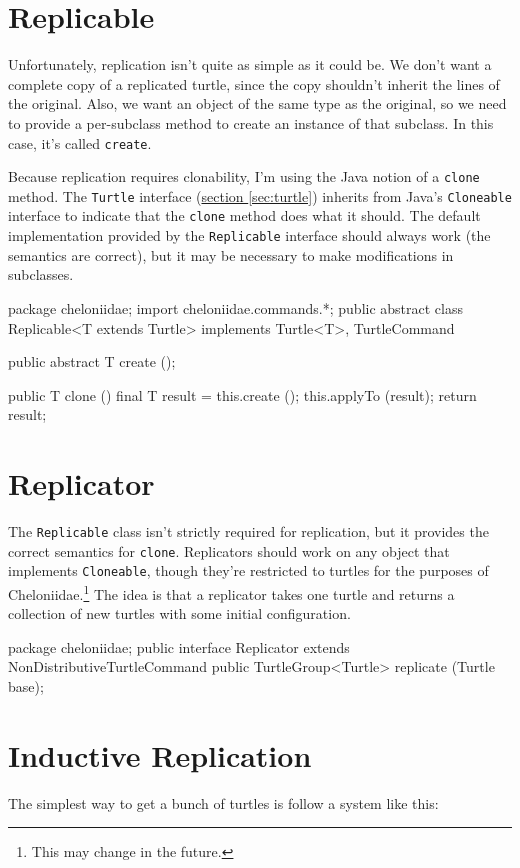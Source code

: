\documentclass{report}
\newcommand{\Ref}[2]{\hyperref[#2]{#1 \ref*{#2}}}
\begin{document}
\section {Replicable} \label{sec:replicable}
      Unfortunately, replication isn't quite as simple as it could be. We don't want a complete copy of a replicated turtle, since the copy shouldn't inherit
      the lines of the original. Also, we want an object of the same type as the original, so we need to provide a per-subclass method to create an instance of
      that subclass. In this case, it's called {\tt create}.

      Because replication requires clonability, I'm using the Java notion of a {\tt clone} method. The {\tt Turtle} interface (\Ref{section}{sec:turtle})
      inherits from Java's {\tt Cloneable} interface to indicate that the {\tt clone} method does what it should. The default implementation provided by the
      {\tt Replicable} interface should always work (the semantics are correct), but it may be necessary to make modifications in subclasses.

\begin{javacode}
package cheloniidae;
import cheloniidae.commands.*;
public abstract class Replicable<T extends Turtle> implements Turtle<T>, TurtleCommand {
  public abstract T create ();

  public T clone () {
    final T result = this.create ();
    this.applyTo (result);
    return result;
  }
}
\end{javacode}

\section {Replicator} \label{sec:replicator}
      The {\tt Replicable} class isn't strictly required for replication, but it provides the correct semantics for {\tt clone}. Replicators should work on any
      object that implements {\tt Cloneable}, though they're restricted to turtles for the purposes of Cheloniidae.\footnote{This may change in the future.} The
      idea is that a replicator takes one turtle and returns a collection of new turtles with some initial configuration.

\begin{javacode}
package cheloniidae;
public interface Replicator extends NonDistributiveTurtleCommand {
  public TurtleGroup<Turtle> replicate (Turtle base);
}
\end{javacode}

\section {Inductive Replication} \label{sec:inductive-replication}
      The simplest way to get a bunch of turtles is follow a system like this:
\end{document}
